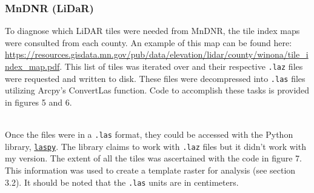 \documentclass[article,12pt]{article}
\numberwithin{equation}{section}
\begin{document}
\subsubsection{MnDNR (LiDaR)}
\begin{adjustwidth}{-.8in}{-.8in}
	\begin{multicols}{2}
		
To diagnose which LiDAR tiles were needed from MnDNR, the tile index maps were consulted from each county. An example of this map can be found here: \url{https://resources.gisdata.mn.gov/pub/data/elevation/lidar/county/winona/tile_index_map.pdf}. This list of tiles was iterated over and their respective \texttt{.laz} files were requested and written to disk. These files were decompressed into \texttt{.las} files utilizing Arcpy's ConvertLas function. Code to accomplish these tasks is provided in figures 5 and 6.


\end{multicols}
\end{adjustwidth}
	\\


Once the files were in a \texttt{.las} format, they could be accessed with the Python library, \href{https://laspy.readthedocs.io/en/latest/index.html}{\texttt{laspy}}. The library claims to work with \texttt{.laz} files but it didn't work with my version. The extent of all the tiles was ascertained with the code in figure 7. This information was used to create a template raster for analysis (see section 3.2). It should be noted that the \texttt{.las} units are in centimeters.
\end{document}

